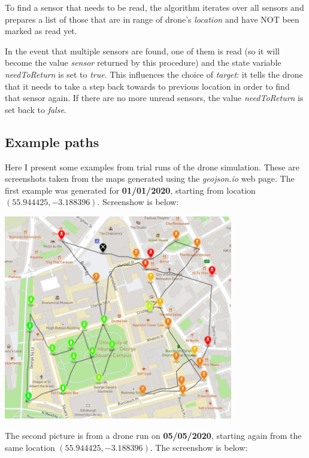 \documentclass{article}
\begin{document}
To find a sensor that needs to be read, the algorithm iterates over all sensors and prepares a list of those that are in range of drone's \textit{location} and have NOT been marked as read yet.

In the event that multiple sensors are found, one of them is read (so it will become the value \textit{sensor} returned by this procedure) and the state variable \textit{needToReturn} is set to \textit{true}. This influences the choice of \textit{target}: it tells the drone that it needs to take a step back towards to previous location in order to find that sensor again. If there are no more unread sensors, the value \textit{needToReturn} is set back to \textit{false}.

\subsection{Example paths}

Here I present some examples from trial runs of the drone simulation. These are screenshots taken from the maps generated using the \textit{geojson.io} web page. The first example was generated for \textbf{01/01/2020}, starting from location $(55.944425, -3.188396)$. Screenshow is below:

\begin{center}
\includegraphics[width=0.75\textwidth]{01-01-2020-v2}
\end{center}

The second picture is from a drone run on \textbf{05/05/2020}, starting again from the same location $(55.944425, -3.188396)$. The screenshow is below:
\end{document}
